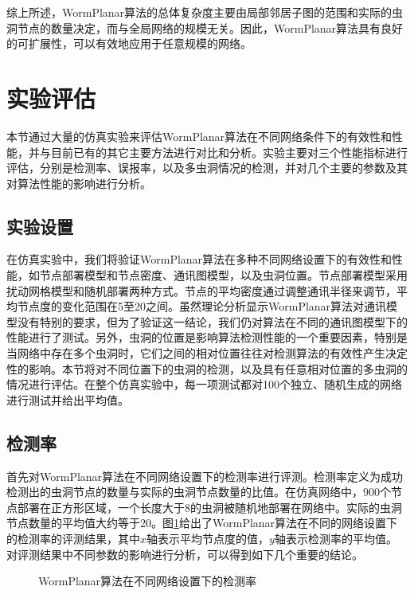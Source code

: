 综上所述，WormPlanar算法的总体复杂度主要由局部邻居子图的范围和实际的虫洞节点的数量决定，而与全局网络的规模无关。因此，WormPlanar算法具有良好的可扩展性，可以有效地应用于任意规模的网络。
\section{实验评估}
本节通过大量的仿真实验来评估WormPlanar算法在不同网络条件下的有效性和性能，并与目前已有的其它主要方法进行对比和分析。实验主要对三个性能指标进行评估，分别是检测率、误报率，以及多虫洞情况的检测，并对几个主要的参数及其对算法性能的影响进行分析。
\subsection{实验设置}
在仿真实验中，我们将验证WormPlanar算法在多种不同网络设置下的有效性和性能，如节点部署模型和节点密度、通讯图模型，以及虫洞位置。节点部署模型采用扰动网格模型和随机部署两种方式。节点的平均密度通过调整通讯半径来调节，平均节点度的变化范围在5至20之间。虽然理论分析显示WormPlanar算法对通讯模型没有特别的要求，但为了验证这一结论，我们仍对算法在不同的通讯图模型下的性能进行了测试。另外，虫洞的位置是影响算法检测性能的一个重要因素，特别是当网络中存在多个虫洞时，它们之间的相对位置往往对检测算法的有效性产生决定性的影响。本节将对不同位置下的虫洞的检测，以及具有任意相对位置的多虫洞的情况进行评估。在整个仿真实验中，每一项测试都对100个独立、随机生成的网络进行测试并给出平均值。
\subsection{检测率}
首先对WormPlanar算法在不同网络设置下的检测率进行评测。检测率定义为成功检测出的虫洞节点的数量与实际的虫洞节点数量的比值。在仿真网络中，900个节点部署在正方形区域，一个长度大于8的虫洞被随机地部署在网络中。实际的虫洞节点数量的平均值大约等于20。图\ref{fig:406}给出了WormPlanar算法在不同的网络设置下的检测率的评测结果，其中$x$轴表示平均节点度的值，$y$轴表示检测率的平均值。对评测结果中不同参数的影响进行分析，可以得到如下几个重要的结论。
\begin{figure}[t]
  \centering
  \hspace{0.5em}%
  \hspace{0.5em}%
  \hspace{0.5em}%
  \caption{WormPlanar算法在不同网络设置下的检测率}
  \label{fig:406}
\end{figure}
